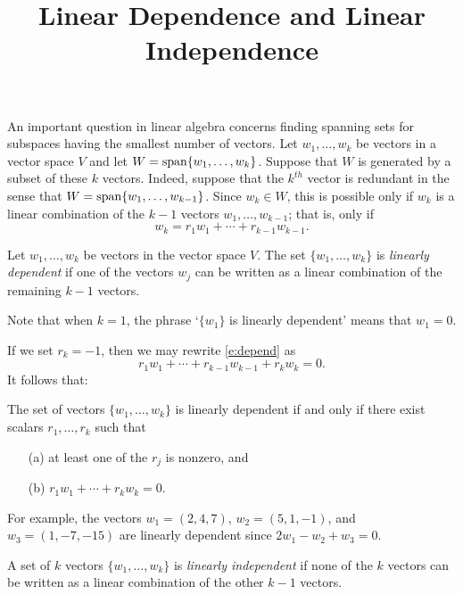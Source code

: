 \documentclass{ximera}
\title{Linear Dependence and Linear Independence}
\begin{document}
\begin{abstract}
\end{abstract}
\maketitle

 \label{S:5.4}

An important question in linear algebra concerns finding spanning
sets for subspaces having the smallest
number of vectors. Let $w_1,\ldots,w_k$ be vectors in a vector
space $V$ and let $W={\rm span}\{w_1,\ldots,w_k\}$.  
Suppose that $W$ is generated by a subset of these $k$ vectors.
Indeed, suppose that the $k^{th}$ vector is redundant in the
sense that $W={\rm span}\{w_1,\ldots,w_{k-1}\}$.  Since $w_k\in W$,
this is possible only if $w_k$ is a linear combination of the
$k-1$ vectors $w_1,\ldots,w_{k-1}$; that is, only if
\begin{equation}  \label{e:depend}
w_k = r_1w_1 + \cdots + r_{k-1}w_{k-1}.
\end{equation}
\begin{definition}  \label{lineardependence}
Let $w_1,\ldots,w_k$ be vectors in the vector space $V$.  The set
$\{w_1,\ldots,w_k\}$ is {\em linearly dependent\/} if one of the vectors
$w_j$ can be written as a linear combination of the remaining $k-1$ vectors.
\end{definition}  
Note that when $k=1$, the phrase `$\{w_1\}$ is linearly dependent'
means that $w_1=0$.

If we set $r_k=-1$, then we may rewrite \eqref{e:depend} as
\[
r_1w_1 + \cdots + r_{k-1}w_{k-1} + r_k w_k =0.
\]
It follows that:
\begin{lemma}  \label{L:lindep}
The set of vectors $\{w_1,\ldots,w_k\}$ is linearly dependent if and
only if there exist scalars $r_1,\ldots,r_k$ such that
\begin{itemize}
\item[(a)]   at least one of the $r_j$ is nonzero, and
\item[(b)]   $r_1w_1 + \cdots + r_k w_k =0.$
\end{itemize}
\end{lemma}

For example, the vectors $w_1=(2,4,7)$, $w_2=(5,1,-1)$, and
$w_3=(1,-7,-15)$ are linearly dependent since $2w_1-w_2+w_3=0$.

\begin{definition}  \label{linearindependence}
A set of $k$ vectors $\{w_1,\ldots,w_k\}$ is {\em linearly
independent\/} if none of the $k$ vectors can be written as a
linear combination of the other $k-1$ vectors.
\end{definition} 
\end{document}

